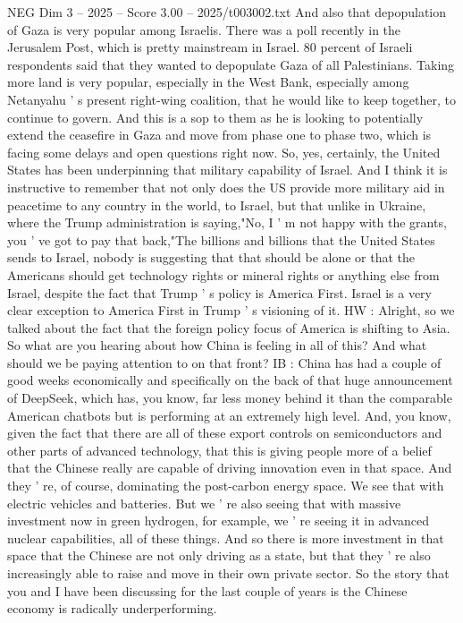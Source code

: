 \begin{textsample}{NEG Dim 3 – 2025 – Score 3.00 – 2025/t003002.txt}
And also that depopulation of Gaza is very popular among Israelis.
There was a poll recently in the Jerusalem Post, which is pretty mainstream in Israel. 80 percent of Israeli respondents said that they wanted to depopulate Gaza of all Palestinians.
Taking more land is very popular, especially in the West Bank, especially among Netanyahu ' s present right-wing coalition, that he would like to keep together, to continue to govern.
And this is a sop to them as he is looking to potentially extend the ceasefire in Gaza and move from phase one to phase two, which is facing some delays and open questions right now.
So, yes, certainly, the United States has been underpinning that military capability of Israel.
And I think it is instructive to remember that not only does the US provide more military aid in peacetime to any country in the world, to Israel, but that unlike in Ukraine, where the Trump administration is saying,"No, I ' m not happy with the grants, you ' ve got to pay that back,"The billions and billions that the United States sends to Israel, nobody is suggesting that that should be alone or that the Americans should get technology rights or mineral rights or anything else from Israel, despite the fact that Trump ' s policy is America First.
Israel is a very clear exception to America First in Trump ' s visioning of it.
HW : Alright, so we talked about the fact that the foreign policy focus of America is shifting to Asia.
So what are you hearing about how China is feeling in all of this?
And what should we be paying attention to on that front?
IB : China has had a couple of good weeks economically and specifically on the back of that huge announcement of DeepSeek, which has, you know, far less money behind it than the comparable American chatbots but is performing at an extremely high level.
And, you know, given the fact that there are all of these export controls on semiconductors and other parts of advanced technology, that this is giving people more of a belief that the Chinese really are capable of driving innovation even in that space.
And they ' re, of course, dominating the post-carbon energy space.
We see that with electric vehicles and batteries.
But we ' re also seeing that with massive investment now in green hydrogen, for example, we ' re seeing it in advanced nuclear capabilities, all of these things.
And so there is more investment in that space that the Chinese are not only driving as a state, but that they ' re also increasingly able to raise and move in their own private sector.
So the story that you and I have been discussing for the last couple of years is the Chinese economy is radically underperforming.

\end{textsample}
